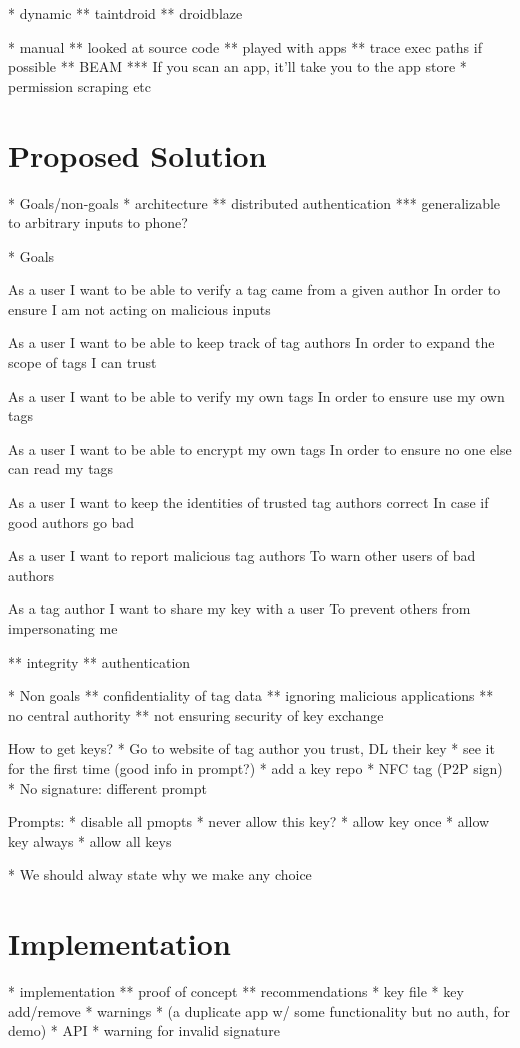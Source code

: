 \documentclass[12pt]{article}
\begin{document}
* dynamic
** taintdroid
** droidblaze

* manual
** looked at source code
** played with apps
** trace exec paths if possible
** BEAM
*** If you scan an app, it'll take you to the app store
* permission scraping etc

\section{Proposed Solution}
* Goals/non-goals
* architecture
** distributed authentication
*** generalizable to arbitrary inputs to phone?

* Goals

As a user
I want to be able to verify a tag came from a given author
In order to ensure I am not acting on malicious inputs

As a user
I want to be able to keep track of tag authors
In order to expand the scope of tags I can trust

As a user
I want to be able to verify my own tags
In order to ensure use my own tags

As a user
I want to be able to encrypt my own tags
In order to ensure no one else can read my tags

As a user
I want to keep the identities of trusted tag authors correct
In case if good authors go bad

As a user
I want to report malicious tag authors
To warn other users of bad authors

As a tag author
I want to share my key with a user
To prevent others from impersonating me

** integrity
** authentication

* Non goals
** confidentiality of tag data
** ignoring malicious applications
** no central authority
** not ensuring security of key exchange


How to get keys?
* Go to website of tag author you trust, DL their key
* see it for the first time (good info in prompt?)
* add a key repo
* NFC tag (P2P sign)
* No signature: different prompt

Prompts:
* disable all pmopts
* never allow this key?
* allow key once
* allow key always
* allow all keys

* We should alway state why we make any choice

\section{Implementation}
* implementation
** proof of concept
** recommendations
* key file
* key add/remove
* warnings
* (a duplicate app w/ some functionality but no auth, for demo)
* API
* warning for invalid signature
\end{document}
